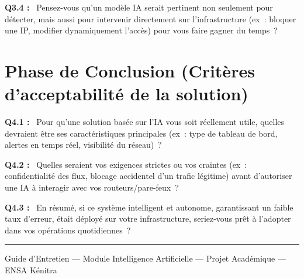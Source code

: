 \documentclass[12pt,a4paper]{article}
\newcommand{\og}{\guillemotleft\,}
\newcommand{\fg}{\,\guillemotright}
\begin{document}
\bigskip

\textbf{Q3.4 :} \og{} Pensez-vous qu'un mod\`{e}le IA serait pertinent non seulement pour d\'{e}tecter, mais aussi
pour intervenir directement sur l'infrastructure (ex~: bloquer une IP, modifier
dynamiquement l'acc\`{e}s) pour vous faire gagner du temps~? \fg{}

\section{Phase de Conclusion (Crit\`{e}res d'acceptabilit\'{e} de la solution)}

\textbf{Q4.1 :} \og{} Pour qu'une solution bas\'{e}e sur l'IA vous soit r\'{e}ellement utile, quelles devraient \^{e}tre
ses caract\'{e}ristiques principales (ex~: type de tableau de bord, alertes en temps r\'{e}el,
visibilit\'{e} du r\'{e}seau)~? \fg{}

\bigskip

\textbf{Q4.2 :} \og{} Quelles seraient vos exigences strictes ou vos craintes (ex~: confidentialit\'{e} des flux,
blocage accidentel d'un trafic l\'{e}gitime) avant d'autoriser une IA \`{a} interagir avec vos
routeurs/pare-feux~? \fg{}

\bigskip

\textbf{Q4.3 :} \og{} En r\'{e}sum\'{e}, si ce syst\`{e}me intelligent et autonome, garantissant un faible taux
d'erreur, \'{e}tait d\'{e}ploy\'{e} sur votre infrastructure, seriez-vous pr\^{e}t \`{a} l'adopter dans vos
op\'{e}rations quotidiennes~? \fg{}

\vspace{2em}
\noindent\rule{\linewidth}{0.4pt}
\begin{center}
  \small Guide d'Entretien --- Module Intelligence Artificielle --- Projet Acad\'{e}mique --- ENSA K\'{e}nitra
\end{center}
\end{document}
